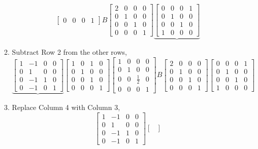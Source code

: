 \documentclass[letterpaper,10pt]{article}
\begin{document}
\begin{enumerate}
\begin{enumerate}
\[\begin{bmatrix}
0 & 0 & 0 & 1
\end{bmatrix}B\begin{bmatrix}
2 & 0 & 0 & 0\\
0 & 1 & 0 & 0\\
0 & 0 & 1 & 0\\
0 & 0 & 0 & 1
\end{bmatrix} \underbrace{\begin{bmatrix}
0 & 0 & 0 & 1\\
0 & 1 & 0 & 0\\
0 & 0 & 1 & 0\\
1 & 0 & 0 & 0
\end{bmatrix}} \]
\item Subtract Row 2 from the other rows,
\[\underbrace{\begin{bmatrix}
1 & -1 & 0 & 0\\
0 & 1 & 0 & 0\\
0 & -1 & 1 & 0\\
0 & -1 & 0 & 1
\end{bmatrix}} \begin{bmatrix}
1 & 0 & 1 & 0\\
0 & 1 & 0 & 0\\
0 & 0 & 1 & 0\\
0 & 0 & 0 & 1
\end{bmatrix} \begin{bmatrix}
1 & 0 & 0 & 0\\
0 & 1 & 0 & 0\\
0 & 0 & \frac{1}{2} & 0\\
0 & 0 & 0 & 1
\end{bmatrix}B\begin{bmatrix}
2 & 0 & 0 & 0\\
0 & 1 & 0 & 0\\
0 & 0 & 1 & 0\\
0 & 0 & 0 & 1
\end{bmatrix} \begin{bmatrix}
0 & 0 & 0 & 1\\
0 & 1 & 0 & 0\\
0 & 0 & 1 & 0\\
1 & 0 & 0 & 0
\end{bmatrix} \]
\item Replace Column 4 with Column 3,
\[\begin{bmatrix}
1 & -1 & 0 & 0\\
0 & 1 & 0 & 0\\
0 & -1 & 1 & 0\\
0 & -1 & 0 & 1
\end{bmatrix} \begin{bmatrix}

\end{bmatrix}\]
\end{enumerate}
\end{enumerate}
\end{document}
